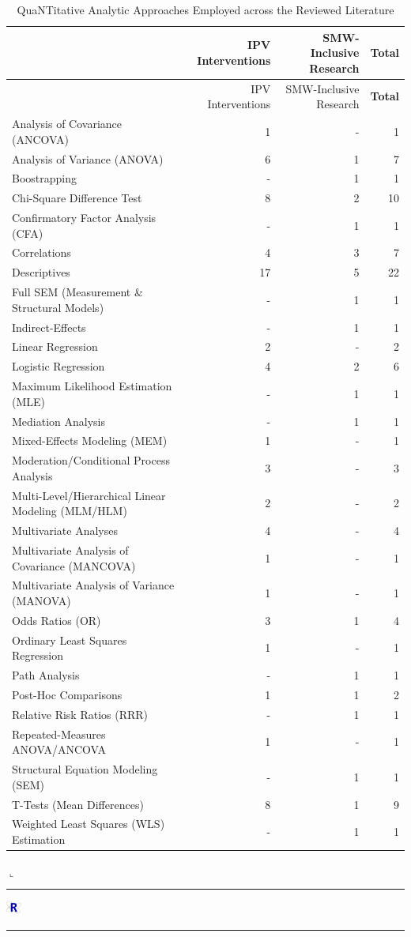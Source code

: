 \documentclass[11pt,]{tufte-book}
\newenvironment{Shaded}{}{}
\newcommand{\KeywordTok}[1]{\textcolor[rgb]{0.00,0.44,0.13}{\textbf{#1}}}
\newcommand{\DataTypeTok}[1]{\textcolor[rgb]{0.56,0.13,0.00}{#1}}
\newcommand{\DecValTok}[1]{\textcolor[rgb]{0.25,0.63,0.44}{#1}}
\newcommand{\CharTok}[1]{\textcolor[rgb]{0.25,0.44,0.63}{#1}}
\newcommand{\StringTok}[1]{\textcolor[rgb]{0.25,0.44,0.63}{#1}}
\newcommand{\OperatorTok}[1]{\textcolor[rgb]{0.40,0.40,0.40}{#1}}
\newcommand{\NormalTok}[1]{#1}
\newcommand{\Rrule}{
    \vspace*{1em}
    \noindent
    \hspace{-1em}
    \includegraphics[width=0.5cm]{auxDocs/Rlogo.png}
    \textcolor{Rblue}{
        \rule[0.1in]{0.90\linewidth}{0.02mm}
    }
    \vspace{-1.35em}
}
\newcommand{\Rerule}{
    \noindent
    \hspace{-1em}
    \textcolor{Rblue}{
        $\llcorner$\rule[-0.4mm]{\linewidth}{0.02mm}
    }
}
\begin{document}
\begin{longtable}[]{@{}lrrr@{}}
\caption{QuaNTitative Analytic Approaches Employed across the Reviewed
Literature \label{tbl:aqt}}\tabularnewline
\toprule
& IPV Interventions & SMW-Inclusive Research &
\textbf{Total}\tabularnewline
\midrule
\endfirsthead
\toprule
& IPV Interventions & SMW-Inclusive Research &
\textbf{Total}\tabularnewline
\midrule
\endhead
Analysis of Covariance (ANCOVA) & 1 & - & 1\tabularnewline
Analysis of Variance (ANOVA) & 6 & 1 & 7\tabularnewline
Boostrapping & - & 1 & 1\tabularnewline
Chi-Square Difference Test & 8 & 2 & 10\tabularnewline
Confirmatory Factor Analysis (CFA) & - & 1 & 1\tabularnewline
Correlations & 4 & 3 & 7\tabularnewline
Descriptives & 17 & 5 & 22\tabularnewline
Full SEM (Measurement \& Structural Models) & - & 1 & 1\tabularnewline
Indirect-Effects & - & 1 & 1\tabularnewline
Linear Regression & 2 & - & 2\tabularnewline
Logistic Regression & 4 & 2 & 6\tabularnewline
Maximum Likelihood Estimation (MLE) & - & 1 & 1\tabularnewline
Mediation Analysis & - & 1 & 1\tabularnewline
Mixed-Effects Modeling (MEM) & 1 & - & 1\tabularnewline
Moderation/Conditional Process Analysis & 3 & - & 3\tabularnewline
Multi-Level/Hierarchical Linear Modeling (MLM/HLM) & 2 & - &
2\tabularnewline
Multivariate Analyses & 4 & - & 4\tabularnewline
Multivariate Analysis of Covariance (MANCOVA) & 1 & - & 1\tabularnewline
Multivariate Analysis of Variance (MANOVA) & 1 & - & 1\tabularnewline
Odds Ratios (OR) & 3 & 1 & 4\tabularnewline
Ordinary Least Squares Regression & 1 & - & 1\tabularnewline
Path Analysis & - & 1 & 1\tabularnewline
Post-Hoc Comparisons & 1 & 1 & 2\tabularnewline
Relative Risk Ratios (RRR) & - & 1 & 1\tabularnewline
Repeated-Measures ANOVA/ANCOVA & 1 & - & 1\tabularnewline
Structural Equation Modeling (SEM) & - & 1 & 1\tabularnewline
T-Tests (Mean Differences) & 8 & 1 & 9\tabularnewline
Weighted Least Squares (WLS) Estimation & - & 1 & 1\tabularnewline
\bottomrule
\end{longtable}

\Rerule

\Rrule

\begin{Shaded}
\end{Shaded}
\end{document}
